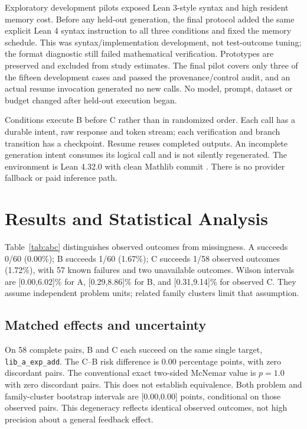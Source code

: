 \documentclass[runningheads,a4paper]{llncs}
\begin{document}
Exploratory development pilots exposed Lean 3-style syntax and high resident
memory cost. Before any held-out generation, the final protocol added the same
explicit Lean 4 syntax instruction to all three conditions and fixed the memory
schedule. This was syntax/implementation development, not test-outcome tuning;
the format diagnostic still failed mathematical verification. Prototypes are
preserved and excluded from study estimates. The final pilot covers only three of the fifteen development cases and passed
the provenance/control audit, and an actual resume invocation generated no new
calls. No model, prompt, dataset or budget changed after held-out execution began.

Conditions execute B before C rather than in randomized order. Each call has a
durable intent, raw response and token stream; each verification and branch
transition has a checkpoint. Resume reuses completed outputs. An incomplete
generation intent consumes its logical call and is not silently regenerated.
The environment is Lean 4.32.0 with clean Mathlib commit
. There is no provider fallback or paid inference path.

\section{Results and Statistical Analysis}
Table~\ref{tab:abc} distinguishes observed outcomes from missingness. A succeeds
0/60 (0.00\%); B succeeds 1/60 (1.67\%); C succeeds 1/58 observed outcomes
(1.72\%), with 57 known failures and two unavailable outcomes. Wilson intervals
are [0.00,6.02]\% for A, [0.29,8.86]\% for B, and [0.31,9.14]\% for observed C.
They assume independent problem units; related family clusters limit that assumption.



\subsection{Matched effects and uncertainty}
On 58 complete pairs, B and C each succeed on the same single target,
\texttt{lib\_a\_exp\_add}. The C--B risk difference is 0.00 percentage points,
with zero discordant pairs. The conventional exact two-sided McNemar value is $p=1.0$ with
zero discordant pairs. This does not establish equivalence. Both problem and family-cluster
bootstrap intervals are [0.00,0.00] points, conditional on those observed pairs.
This degeneracy reflects identical observed outcomes, not high precision about
a general feedback effect.
\end{document}
